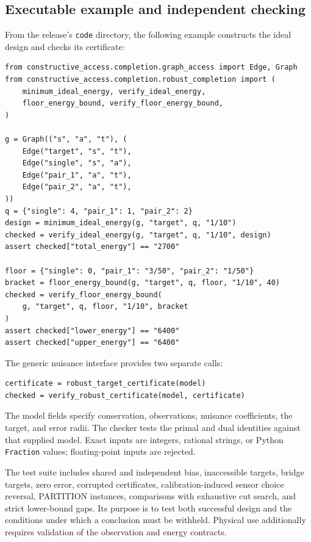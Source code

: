 \subsection{Executable example and independent checking}
From the release's \texttt{code} directory, the following example constructs
the ideal design and checks its certificate:
\begin{verbatim}
from constructive_access.completion.graph_access import Edge, Graph
from constructive_access.completion.robust_completion import (
    minimum_ideal_energy, verify_ideal_energy,
    floor_energy_bound, verify_floor_energy_bound,
)

g = Graph(("s", "a", "t"), (
    Edge("target", "s", "t"),
    Edge("single", "s", "a"),
    Edge("pair_1", "a", "t"),
    Edge("pair_2", "a", "t"),
))
q = {"single": 4, "pair_1": 1, "pair_2": 2}
design = minimum_ideal_energy(g, "target", q, "1/10")
checked = verify_ideal_energy(g, "target", q, "1/10", design)
assert checked["total_energy"] == "2700"

floor = {"single": 0, "pair_1": "3/50", "pair_2": "1/50"}
bracket = floor_energy_bound(g, "target", q, floor, "1/10", 40)
checked = verify_floor_energy_bound(
    g, "target", q, floor, "1/10", bracket
)
assert checked["lower_energy"] == "6400"
assert checked["upper_energy"] == "6400"
\end{verbatim}

The generic nuisance interface provides two separate calls:
\begin{verbatim}
certificate = robust_target_certificate(model)
checked = verify_robust_certificate(model, certificate)
\end{verbatim}
The model fields specify conservation, observations, nuisance coefficients,
the target, and error radii. The checker tests the primal and dual identities
against that supplied model. Exact inputs are integers,
rational strings, or Python \texttt{Fraction} values; floating-point inputs
are rejected.

The test suite includes shared and independent bias, inaccessible targets,
bridge targets, zero error, corrupted certificates, calibration-induced sensor
choice reversal, PARTITION instances, comparisons with exhaustive cut search,
and strict lower-bound gaps. Its purpose is to test both successful design
and the conditions under which a conclusion must be withheld. Physical use
additionally requires validation of the observation and energy contracts.
